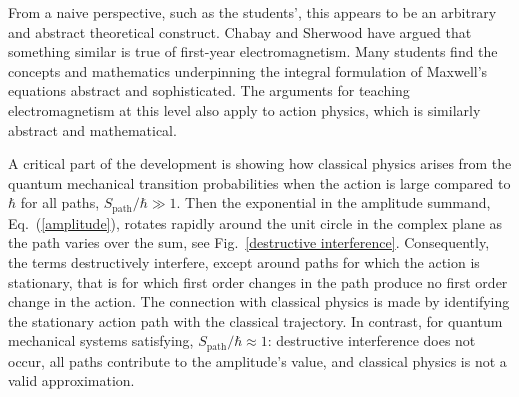 \documentclass[prb,oncolumn,12pt]{revtex4-2}
\begin{document}
From a naive perspective, such as the students', this appears to be an arbitrary and abstract theoretical construct. Chabay and Sherwood have argued that something similar is true of first-year electromagnetism. \cite{ChabayEM} Many students find the concepts and mathematics underpinning the integral formulation of Maxwell's equations abstract and sophisticated. The arguments for teaching electromagnetism at this level also apply to action physics, which is similarly abstract and mathematical.

A critical part of the development is showing how classical physics arises from the quantum mechanical transition probabilities when the action is large compared to $\hbar$ for all paths, $S_\textrm{path} / \hbar \gg 1$. Then the exponential in the amplitude summand, Eq.~(\ref{amplitude}), rotates rapidly around the unit circle in the complex plane as the path varies over the sum, see Fig.~\ref{destructive interference}. Consequently, the terms destructively interfere, except around paths for which the action is stationary, that is for which first order changes in the path produce no first order change in the action. \cite{TaylorCIP, Ogborn, QED} The connection with classical physics is made by identifying the stationary action path with the classical trajectory. In contrast, for quantum mechanical systems satisfying, $S_\textrm{path} / \hbar \approx 1$: destructive interference does not occur, all paths contribute to the amplitude's value, and classical physics is not a valid approximation.
\end{document}
